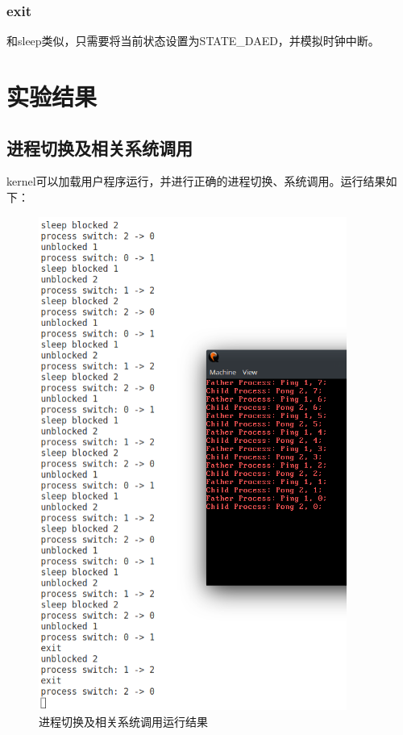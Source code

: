 \documentclass[12pt,a4paper,UTF8]{article}
\begin{document}
\subsubsection{exit}
和sleep类似，只需要将当前状态设置为STATE\_DAED，并模拟时钟中断。


\section{实验结果}
\subsection{进程切换及相关系统调用}
kernel可以加载用户程序运行，并进行正确的进程切换、系统调用。运行结果如下：
\begin{figure}[htbp]
	\centering
	\includegraphics[width=0.9\textwidth]{switch}
	\caption{进程切换及相关系统调用运行结果}
\end{figure}
\end{document}
